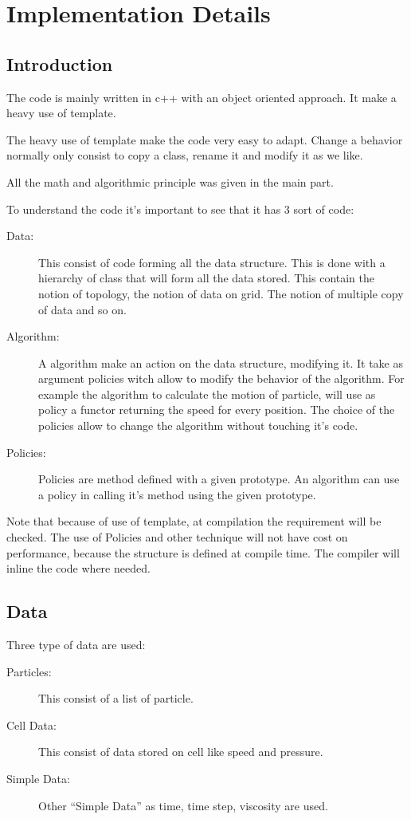 \appendix
\chapter{Implementation Details}

\section{Introduction}
The code is mainly written in c++ with an object oriented approach.
It make a heavy use of template.

The heavy use of template make the code very easy to adapt. Change a behavior normally only consist to copy a class,
rename it and modify it as we like.

All the math and algorithmic principle was given in the main part. 

To understand the code it's important to see that it has 3 sort of code:
\begin{description}
	\item[Data:] This consist of code forming all the data structure.
	This is done with a hierarchy of class that will form all the data stored.
	This contain the notion of topology, the notion of data on grid.
	The notion of multiple copy of data and so on.
	\item[Algorithm:] A algorithm make an action on the data structure, modifying it.
	It take as argument policies witch allow to modify the behavior of the algorithm.
	For example the algorithm to calculate the motion of particle, will use as policy a functor returning the speed for every position.
	The choice of the policies allow to change the algorithm without touching it's code.
	\item[Policies:] Policies are method defined with a given prototype. An algorithm can use a policy in calling it's method using the given prototype.
\end{description}

Note that because of use of template, at compilation the requirement will be checked.
The use of Policies and other technique will not have cost on performance,
because the structure is defined at compile time. The compiler will inline the code where needed.

\section{Data}

Three type of data are used:
\begin{description}
	\item[Particles:] This consist of a list of particle.
	\item[Cell Data:] This consist of data stored on cell like speed and pressure.
	\item[Simple Data:] Other ``Simple Data'' as time, time step, viscosity are used.
\end{description}


